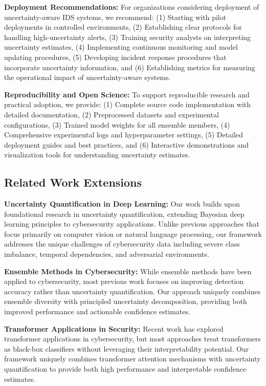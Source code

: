 \documentclass[journal]{IEEEtran}
\begin{document}
\textbf{Deployment Recommendations:} For organizations considering deployment of uncertainty-aware IDS systems, we recommend: (1) Starting with pilot deployments in controlled environments, (2) Establishing clear protocols for handling high-uncertainty alerts, (3) Training security analysts on interpreting uncertainty estimates, (4) Implementing continuous monitoring and model updating procedures, (5) Developing incident response procedures that incorporate uncertainty information, and (6) Establishing metrics for measuring the operational impact of uncertainty-aware systems.

\textbf{Reproducibility and Open Science:} To support reproducible research and practical adoption, we provide: (1) Complete source code implementation with detailed documentation, (2) Preprocessed datasets and experimental configurations, (3) Trained model weights for all ensemble members, (4) Comprehensive experimental logs and hyperparameter settings, (5) Detailed deployment guides and best practices, and (6) Interactive demonstrations and visualization tools for understanding uncertainty estimates.

\subsection{Related Work Extensions}

\textbf{Uncertainty Quantification in Deep Learning:} Our work builds upon foundational research in uncertainty quantification, extending Bayesian deep learning principles to cybersecurity applications. Unlike previous approaches that focus primarily on computer vision or natural language processing, our framework addresses the unique challenges of cybersecurity data including severe class imbalance, temporal dependencies, and adversarial environments.

\textbf{Ensemble Methods in Cybersecurity:} While ensemble methods have been applied to cybersecurity, most previous work focuses on improving detection accuracy rather than uncertainty quantification. Our approach uniquely combines ensemble diversity with principled uncertainty decomposition, providing both improved performance and actionable confidence estimates.

\textbf{Transformer Applications in Security:} Recent work has explored transformer applications in cybersecurity, but most approaches treat transformers as black-box classifiers without leveraging their interpretability potential. Our framework uniquely combines transformer attention mechanisms with uncertainty quantification to provide both high performance and interpretable confidence estimates.
\end{document}
